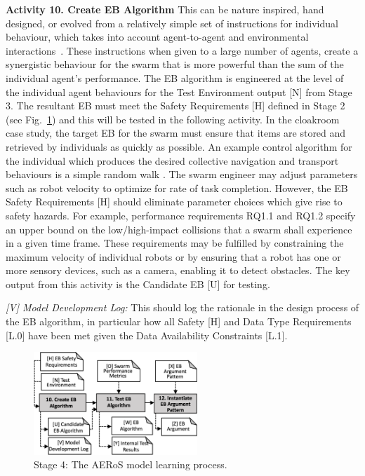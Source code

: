 \documentclass[runningheads]{llncs}
\begin{document}
\noindent\textbf{Activity 10. Create EB Algorithm} 
This can be nature inspired, hand designed, or evolved from a relatively simple set of instructions for individual behaviour, which takes into account agent-to-agent and environmental interactions~\cite{Jones2018}. These instructions when given to a large number of agents, create a synergistic behaviour for the swarm that is more powerful than the sum of the individual agent's performance. 
The EB algorithm is engineered at the level of the individual agent behaviours for the Test Environment output [N] from Stage 3. The resultant EB must meet the Safety Requirements [H] defined in Stage 2 (see Fig.~\ref{amlas-a-stage4}) and this will be tested in the following activity. 
In the cloakroom case study, the target EB for the swarm must ensure that items are stored and retrieved by individuals as quickly as possible. An example control algorithm for the individual which produces the desired collective navigation and transport behaviours is a simple random walk \cite{milner2022stochastic}. The swarm engineer may adjust parameters such as robot velocity to optimize for rate of task completion. However, the EB Safety Requirements [H] should eliminate parameter choices which give rise to safety hazards. 
For example, performance requirements RQ1.1 and RQ1.2 specify an upper bound on the low/high-impact collisions that a swarm shall experience in a given time frame. 
These requirements may be fulfilled by constraining the maximum velocity of individual robots or by ensuring that a robot has one or more sensory devices, such as a camera, enabling it to detect obstacles. 
The key output from this activity is the Candidate EB [U] for testing.

\emph{[V] Model Development Log:} This should log the rationale in the design process of the EB algorithm, in particular how all Safety [H] and Data Type Requirements [L.0] have been met given the Data Availability Constraints [L.1].

\begin{figure}[!t]
\centering
\includegraphics[width=0.55\textwidth]{figures/AERoS-Stage4-V3.pdf}
\vspace{-2ex}
\caption{Stage 4: The AERoS model learning process.}
\label{amlas-a-stage4}
\end{figure}
\end{document}
